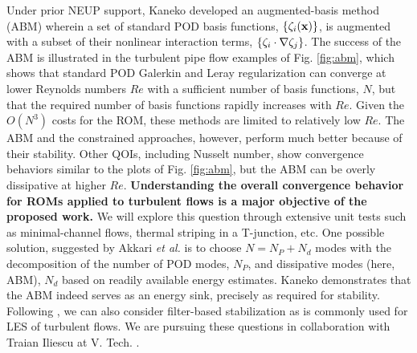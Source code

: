   Under prior NEUP support, Kaneko \cite{kaneko22a,kaneko22} developed an
augmented-basis method (ABM) wherein a set of standard POD basis functions,
$\{\mathbf{\zeta}_i(\mathbf{x}) \}$,  is augmented with a subset of their nonlinear
interaction terms, $\{\mathbf{\zeta}_i \cdot \nabla \mathbf{\zeta}_j\}$.  The success of the
ABM is illustrated in the turbulent pipe flow examples of Fig. \ref{fig:abm},
which shows that standard POD Galerkin and Leray regularization can converge at
lower Reynolds numbers $Re$ with a sufficient number of basis functions, $N$,
but that the required number of basis functions rapidly increases with $Re$.
Given the $O(N^3)$ costs for the ROM, these methods are limited to relatively
low $Re$.  The ABM and the constrained approaches, however, perform much better
because of their stability.  Other QOIs, including Nusselt number, show 
convergence behaviors similar to the plots of Fig. \ref{fig:abm},
but the ABM can be overly dissipative at higher $Re$.  \textbf{Understanding the
overall convergence behavior for ROMs applied to turbulent flows is a major
objective of the proposed work.} We will explore this question through
extensive unit tests such as minimal-channel flows, thermal striping in a
T-junction, etc.
  One possible solution, suggested by Akkari {\em et al.} \cite{akkari19} is to
choose $N=N_P + N_d$ modes with the decomposition of the number
of POD modes, $N_P$, and dissipative modes (here, ABM), $N_d$ based on
readily available energy estimates.  
Kaneko \cite{kaneko22a,kaneko22} demonstrates that the ABM indeed serves as an
energy sink, precisely as required for stability.
  Following \cite{wang2012proper}, we can also consider filter-based
stabilization as is commonly used for LES of turbulent flows.  We are 
pursuing these questions in collaboration with Traian Iliescu at V. Tech.
\cite{mou2021}.

